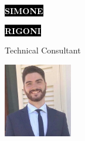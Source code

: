 \documentclass[9pt]{developercv} %
\begin{document}

\begin{minipage}[t]{0.375\textwidth} %
	\vspace{-\baselineskip} %
	
	\colorbox{black}{{\HUGE\textcolor{white}{\textbf{\MakeUppercase{Simone}}}}} %
	
	\colorbox{black}{{\HUGE\textcolor{white}{\textbf{\MakeUppercase{Rigoni}}}}} %
	
	\vspace{6pt}
	
	{\huge Technical Consultant} %
\end{minipage}
\begin{minipage}[t]{0.225\textwidth} %
	\vspace{-\baselineskip} %
	
	\includegraphics[width=3cm]{image_1}
\end{minipage}
\end{document}
